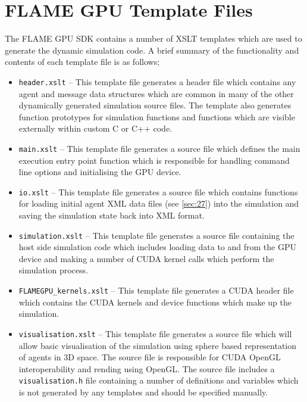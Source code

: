 \documentclass[11pt, a4paper, onecolumn, oneside]{report}
\begin{document}
\section{FLAME GPU Template Files}
\label{sec:43}


The FLAME GPU SDK contains a number of XSLT templates which are used to generate the dynamic simulation code.
A brief summary of the functionality and contents of each template file is as follows; 

\begin{itemize}
    \item \texttt{header.xslt} -- This template file generates a header file which contains any agent and message data structures which are common in many of the other dynamically generated simulation source files.
        The template also generates function prototypes for simulation functions and functions which are visible externally within custom C or C++ code.
    \item \texttt{main.xslt} -- This template file generates a source file which defines the main execution entry point function which is responsible for handling command line options and initialising the GPU device.
    \item \texttt{io.xslt} -- This template file generates a source file which contains functions for loading initial agent XML data files (see \cref{sec:27}) into the simulation and saving the simulation state back into XML   format.
    \item \texttt{simulation.xslt} -- This template file generates a source file containing the host side simulation code which includes loading data to and from the GPU device and making a number of CUDA kernel calls which perform the simulation process.
    \item \texttt{FLAMEGPU\_kernels.xslt} -- This template file generates a CUDA header file which contains the CUDA kernels and device functions which make up the simulation.
    \item \texttt{visualisation.xslt} -- This template file generates a source file which will allow basic visualisation of the simulation using sphere based representation of agents in 3D space.
        The source file is responsible for CUDA OpenGL interoperability and rending using OpenGL.
        The source file includes a \texttt{visualisation.h} file containing a number of definitions and variables which is not generated by any templates and should be specified manually.
\end{itemize}
\end{document}
